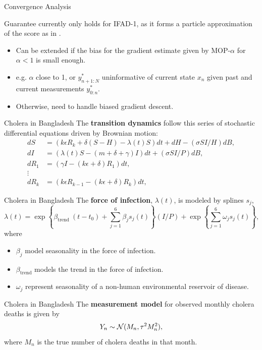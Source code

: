 \documentclass{beamer}
\begin{document}
\begin{frame}{Convergence Analysis}

    Guarantee currently only holds for IFAD-1, as it forms a particle approximation of the score as in \cite{poyiadjis11}.
    \begin{itemize}
        \item \pause Can be extended if the bias for the gradient estimate given by MOP-$\alpha$ for $\alpha < 1$ is small enough.
        \item \pause e.g. $\alpha$ close to 1, or $y_{n+1:N}^*$ uninformative of current state $x_n$ given past and current measurements $y_{0:n}^*$.
        \item \pause Otherwise, need to handle biased gradient descent.
    \end{itemize}

\end{frame}




\begin{frame}{Cholera in Bangladesh}
    The \textbf{transition dynamics} follow this series of stochastic differential equations driven by Brownian motion:
    \begin{align*}
        d S&=\left(k \epsilon R_k+\delta(S-H)-\lambda(t) S\right) d t+d H-(\sigma S I / H) d B, \\ 
        d I&=\left(\lambda(t) S-(m+\delta+\gamma) I\right) d t+(\sigma S I / P) d B, \\ 
        d R_1&=\left(\gamma I-(k \epsilon+\delta) R_1\right) d t, \\ 
        \vdots \\ 
        d R_k&=\left(k \epsilon R_{k-1}-(k \epsilon+\delta) R_k\right) d t,
    \end{align*}
\end{frame}

\begin{frame}{Cholera in Bangladesh}
The \textbf{force of infection}, $\lambda(t)$, is modeled by splines $s_j$, 
    \begin{equation*}
        \lambda(t)=\exp \left\{\beta_{\text {trend }}\left(t-t_0\right)+\sum_{j=1}^{6} \beta_j s_j(t)\right\}(I / P) + \exp \left\{\sum_{j=1}^{6} \omega_j s_j(t)\right\},
    \end{equation*}
    where
    \begin{itemize}
        \item \pause $\beta_j$ model seasonality in the force of infection.
        \item \pause $\beta_{\text{trend}}$ models the trend in the force of infection.
        \item \pause $\omega_j$ represent seasonality of a non-human environmental reservoir of disease.
    \end{itemize}
    
\end{frame}

\begin{frame}{Cholera in Bangladesh}
    The \textbf{measurement model} for observed monthly cholera deaths is given by 
    \begin{equation*}
        Y_n \sim {\mathcal{N}}(M_n, \tau^2M_n^2),
    \end{equation*}
    where $M_n$ is the true number of cholera deaths in that month.
\end{frame}
\end{document}
